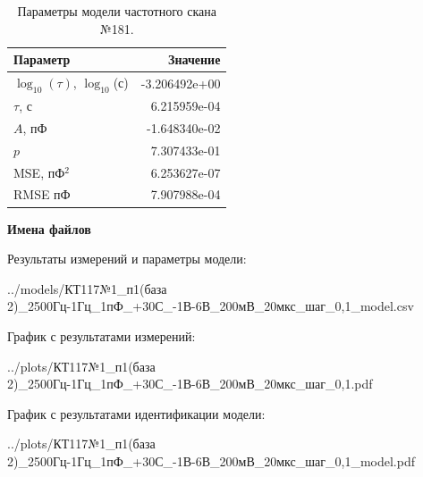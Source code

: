 \begin{table}[!ht]
    \centering
    \caption{Параметры модели частотного скана №181.}
    \begin{tabular}{|l|r|}
        \hline
        Параметр                                       & Значение                  \\ \hline
        $\log_{10}(\tau)$, $\log_{10}$(с)              & -3.206492e+00             \\ \hline
        $\tau$, с                                      & 6.215959e-04              \\ \hline
        $A$, пФ                                        & -1.648340e-02             \\ \hline
        $p$                                            & 7.307433e-01              \\ \hline
        MSE, пФ$^2$                                    & 6.253627e-07              \\ \hline
        RMSE пФ                                        & 7.907988e-04              \\ \hline
    \end{tabular}
    \label{table:frequency_scan_model_181}
\end{table}

\textbf{Имена файлов}

Результаты измерений и параметры модели:

\scriptsize../models/КТ117№1\_п1(база 2)\_2500Гц-1Гц\_1пФ\_+30С\_-1В-6В\_200мВ\_20мкс\_шаг\_0,1\_model.csv
\normalsize

График с результатами измерений:

\scriptsize../plots/КТ117№1\_п1(база 2)\_2500Гц-1Гц\_1пФ\_+30С\_-1В-6В\_200мВ\_20мкс\_шаг\_0,1.pdf
\normalsize

График с результатами идентификации модели:

\scriptsize../plots/КТ117№1\_п1(база 2)\_2500Гц-1Гц\_1пФ\_+30С\_-1В-6В\_200мВ\_20мкс\_шаг\_0,1\_model.pdf
\normalsize

